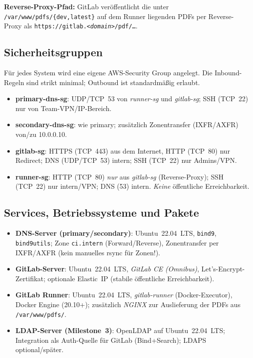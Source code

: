 \documentclass[a4paper,12pt]{article}
\begin{document}
\noindent
\textbf{Reverse-Proxy-Pfad:} GitLab veröffentlicht die unter
\texttt{/var/www/pdfs/\{dev,latest\}} auf dem Runner liegenden PDFs per
Reverse-Proxy als \texttt{https://gitlab.\emph{<domain>}/pdf/\dots}.

\subsection*{Sicherheitsgruppen}

Für jedes System wird eine eigene AWS-Security Group angelegt. Die
Inbound-Regeln sind strikt minimal; Outbound ist standardmäßig erlaubt.

\begin{itemize}
  \item \textbf{primary-dns-sg}: UDP/TCP~53 von \emph{runner-sg} und \emph{gitlab-sg};
        SSH (TCP~22) nur von Team-VPN/IP-Bereich.
  \item \textbf{secondary-dns-sg}: wie primary; zusätzlich Zonentransfer (IXFR/AXFR)
        von/zu 10.0.0.10.
  \item \textbf{gitlab-sg}: HTTPS (TCP~443) aus dem Internet, HTTP (TCP~80) nur Redirect;
        DNS (UDP/TCP~53) intern; SSH (TCP~22) nur Admins/VPN.
  \item \textbf{runner-sg}: HTTP (TCP~80) \emph{nur} aus \emph{gitlab-sg} (Reverse-Proxy);
        SSH (TCP~22) nur intern/VPN; DNS (53) intern. \emph{Keine} öffentliche Erreichbarkeit.
\end{itemize}

\subsection*{Services, Betriebssysteme und Pakete}

\begin{itemize}
  \item \textbf{DNS-Server (primary/secondary)}: Ubuntu~22.04~LTS, \texttt{bind9},
        \texttt{bind9utils}; Zone \texttt{ci.intern} (Forward/Reverse), Zonentransfer
        per IXFR/AXFR (kein manuelles rsync für Zonen!).
  \item \textbf{GitLab-Server}: Ubuntu~22.04~LTS, \emph{GitLab CE (Omnibus)}, Let’s-Encrypt-Zertifikat;
        optionale Elastic~IP (stabile öffentliche Erreichbarkeit).
  \item \textbf{GitLab Runner}: Ubuntu~22.04~LTS, \emph{gitlab-runner} (Docker-Executor),
        Docker Engine (20.10+); zusätzlich \emph{NGINX} zur Auslieferung der PDFs
        aus \texttt{/var/www/pdfs/}.
  \item \textbf{LDAP-Server (Milestone~3)}: OpenLDAP auf Ubuntu~22.04~LTS; Integration als
        Auth-Quelle für GitLab (Bind+Search); LDAPS optional/später.
\end{itemize}
\end{document}
